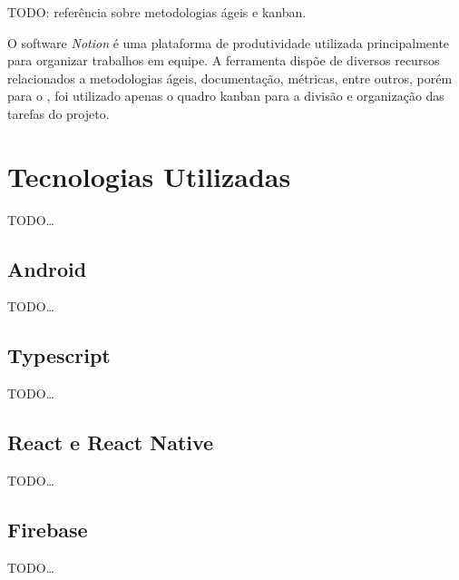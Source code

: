 TODO: referência sobre metodologias ágeis e kanban.

O software \textit{Notion} é uma plataforma de produtividade utilizada principalmente para organizar trabalhos em equipe. A ferramenta dispõe de diversos recursos relacionados a metodologias ágeis, documentação, métricas, entre outros, porém para o \appName, foi utilizado apenas o quadro kanban para a divisão e organização das tarefas do projeto.

\section{Tecnologias Utilizadas}

TODO\dots

\subsection{Android}

TODO\dots

\subsection{Typescript}

TODO\dots

\subsection{React e React Native}

TODO\dots

\subsection{Firebase}

TODO\dots
